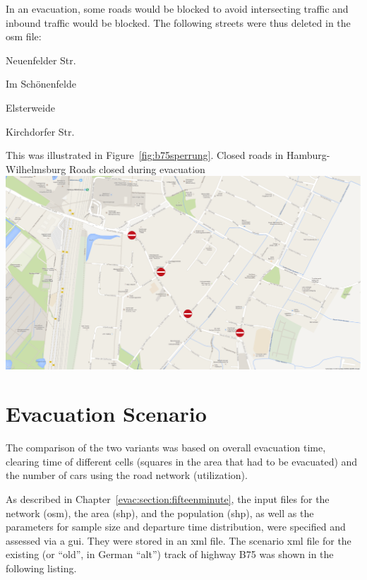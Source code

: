 In an evacuation, some roads would be blocked to avoid intersecting traffic and inbound traffic would be blocked. The following streets were thus deleted in the \gls{osm} file:
%
\begin{compactitem}
	\item Neuenfelder Str. 
	\item Im Schönenfelde
	\item Elsterweide
	\item Kirchdorfer Str.
\end{compactitem}
%
This was illustrated in Figure~\ref{fig:b75sperrung}.
%
%
\createfigure%
{Closed roads in Hamburg-Wilhelmsburg}%
{Roads closed during evacuation}%
{\label{fig:b75sperrung}}%
{\includegraphics[width=0.7\linewidth]{using/figures/B75sperrung}}%
{}

\section{Evacuation Scenario}
The comparison of the two variants was based on overall evacuation time, clearing time of different cells (squares in the area that had to be evacuated) and the number of cars using the road network (utilization).

As described in Chapter~\ref{evac:section:fifteenminute}, the input files for the network (\gls{osm}), the area (shp), and the population (shp), as well as the parameters for sample size and departure time distribution, were specified and assessed via a \gls{gui}. They were stored in an \gls{xml} file. The scenario \gls{xml} file for the existing (or ``old'', in German ``alt'') track of highway B75 was shown in the following listing. 



